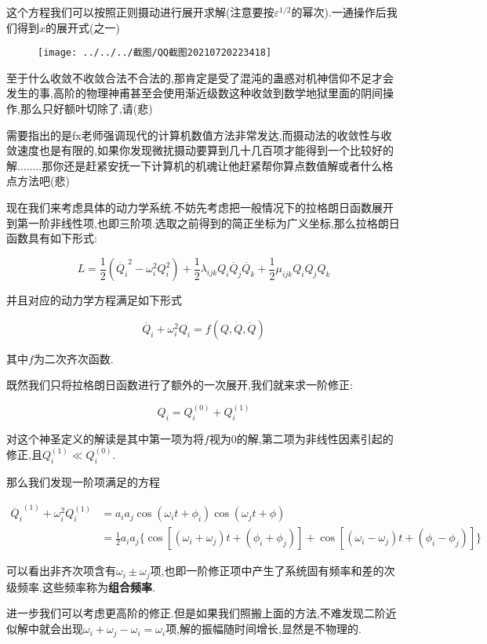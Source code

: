 \documentclass[UTF8]{article}
\begin{document}
	这个方程我们可以按照正则摄动进行展开求解(注意要按$\varepsilon^{1/2}$的幂次).一通操作后我们得到$x$的展开式(之一)
	
	\begin{figure}[H]
		\centering
		\texttt{[image: ../../../截图/QQ截图20210720223418]}
		\label{fig:qq20210720223418}
	\end{figure}
	
	至于什么收敛不收敛合法不合法的,那肯定是受了混沌的蛊惑对机神信仰不足才会发生的事,高阶的物理神甫甚至会使用渐近级数这种收敛到数学地狱里面的阴间操作,那么只好额叶切除了,请(悲)
	
	需要指出的是fx老师强调现代的计算机数值方法非常发达,而摄动法的收敛性与收敛速度也是有限的,如果你发现微扰摄动要算到几十几百项才能得到一个比较好的解........那你还是赶紧安抚一下计算机的机魂让他赶紧帮你算点数值解或者什么格点方法吧(悲)
	
	现在我们来考虑具体的动力学系统.不妨先考虑把一般情况下的拉格朗日函数展开到第一阶非线性项,也即三阶项.选取之前得到的简正坐标为广义坐标,那么拉格朗日函数具有如下形式:
	
	\[L=\frac12 (\dot{Q_i}^2-\omega_i^2Q_i^2)+\frac12 \lambda_{ijk}Q_i\dot{Q_j}\dot{Q_k}+\frac12 \mu_{ijk}Q_iQ_jQ_k\]
	
	并且对应的动力学方程满足如下形式
	
	\[\ddot{Q_i}+\omega_i^2Q_i=f(Q,\dot{Q},\ddot{Q})\]
	
	其中$f$为二次齐次函数.
	
	既然我们只将拉格朗日函数进行了额外的一次展开,我们就来求一阶修正:
	
	\[Q_i=Q_i^{(0)}+Q_i^{(1)}\]
	
	对这个神圣定义的解读是其中第一项为将$f$视为0的解,第二项为非线性因素引起的修正,且$Q_i^{(1)}\ll Q_i^{(0)}$.
	
	那么我们发现一阶项满足的方程
	
	\begin{align*}
		\ddot{Q_i}^{(1)}+\omega_i^2Q_i^{(1)}&=a_ia_j\cos(\omega_i t+\phi_i)\cos(\omega_j t+\phi)\\
		&=\frac12a_ia_j\{\cos[(\omega_i+\omega_j)t+(\phi_i+\phi_j)]+\cos[(\omega_i-\omega_j)t+(\phi_i-\phi_j)]\}
	\end{align*}
	
	可以看出非齐次项含有$\omega_i\pm\omega_j$项,也即一阶修正项中产生了系统固有频率和差的次级频率.这些频率称为\textbf{组合频率}.
	
	进一步我们可以考虑更高阶的修正.但是如果我们照搬上面的方法,不难发现二阶近似解中就会出现$\omega_i+\omega_j-\omega_i=\omega_i$项,解的振幅随时间增长,显然是不物理的.
	
\end{document}
